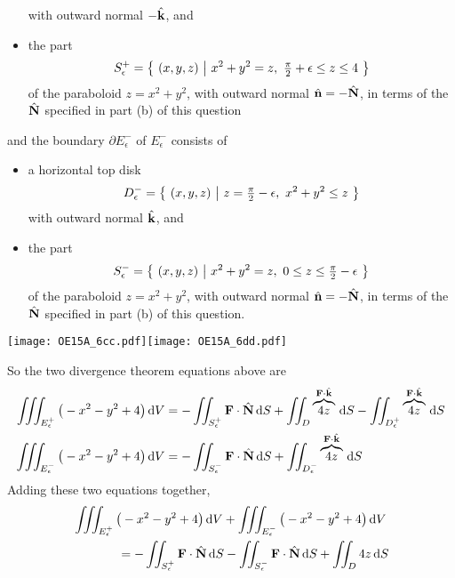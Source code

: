 \begin{solution}
\begin{itemize}
\begin{equation*}
\end{equation*}
 with outward normal $-\hat{\mathbf{k}}$, and
\item the part 
\begin{equation*}
   S_{\epsilon}^+ =\big\{ \ (x,y,z)\ \big|\ x^2+y^2 = z,\ \tfrac{\pi}{2}+\epsilon\le z\le 4\ \big\}
\end{equation*}
of the paraboloid $z=x^2+y^2$, with outward normal $\hat{\mathbf{n}} = -\hat{\mathbf{N}}$,
          in terms of the $\hat{\mathbf{N}}$ specified in part (b) of this question
\end{itemize}
and the boundary $\partial E_\epsilon^-$ of $E_\epsilon^-$ consists of
\begin{itemize}\itemsep1pt \parskip0pt  %
\item a horizontal top disk
\begin{equation*}
   D_{\epsilon}^- =\big\{ \ (x,y,z)\ \big|\ z=\tfrac{\pi}{2}-\epsilon,\ x^2+y^2\le z\ \big\}
\end{equation*} 
with outward normal $\hat{\mathbf{k}}$, and
\item the part 
\begin{equation*}
   S_{\epsilon}^- =\big\{ \ (x,y,z)\ \big|\ x^2+y^2 = z,\ 0\le z\le \tfrac{\pi}{2}-\epsilon\ \big\}
\end{equation*}
of the paraboloid $z=x^2+y^2$, with outward normal $\hat{\mathbf{n}}=-\hat{\mathbf{N}}$,
          in terms of the $\hat{\mathbf{N}}$ specified in part (b) of this question.
\end{itemize}
 \begin{center}
    \texttt{[image: OE15A\_6cc.pdf]}\quad \texttt{[image: OE15A\_6dd.pdf]}
\end{center}
So the two divergence theorem equations above are
\begin{align*}
 \iiint_{E_\epsilon^+} \big(-x^2-y^2+4\big)\,\mathrm{d}V 
 &= -\iint_{S_\epsilon^+}\mathbf{F}\cdot\hat{\mathbf{N}}\,\mathrm{d}S
    + \iint_{D}\overbrace{4z}^{\mathbf{F}\cdot\hat{\mathbf{k}}}\,\mathrm{d}S
    - \iint_{D_\epsilon^+}\overbrace{4z}^{\mathbf{F}\cdot\hat{\mathbf{k}}}\,\mathrm{d}S\\
 \iiint_{E_\epsilon^-} \big(-x^2-y^2+4\big)\,\mathrm{d}V
 &= -\iint_{S_\epsilon^-}\mathbf{F}\cdot\hat{\mathbf{N}}\,\mathrm{d}S
          + \iint_{D_\epsilon^-}\overbrace{4z}^{\mathbf{F}\cdot\hat{\mathbf{k}}}\,\mathrm{d}S
\end{align*}
Adding these two equations together,
\begin{align*}
&\tripInt_{E_\epsilon^+} \big(-x^2-y^2+4\big)\,\dee{V} 
   +  \tripInt_{E_\epsilon^-} \big(-x^2-y^2+4\big)\,\dee{V}\\
&\hskip0.5in= -\dblInt_{S_\epsilon^+}\vF\cdot\hN\,\dee{S}
             -\dblInt_{S_\epsilon^-}\vF\cdot\hN\,\dee{S}
      + \dblInt_{D}4z\,\dee{S}

\end{align*}
\end{solution}
